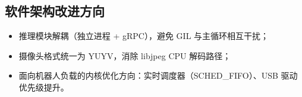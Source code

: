 \subsection{软件架构改进方向}
\begin{itemize}[leftmargin=2em]
  \item 推理模块解耦（独立进程 + gRPC），避免 GIL 与主循环相互干扰；
  \item 摄像头格式统一为 YUYV，消除 libjpeg CPU 解码路径；
  \item 面向机器人负载的内核优化方向：实时调度器（SCHED\_FIFO）、USB 驱动优先级提升。
\end{itemize}

